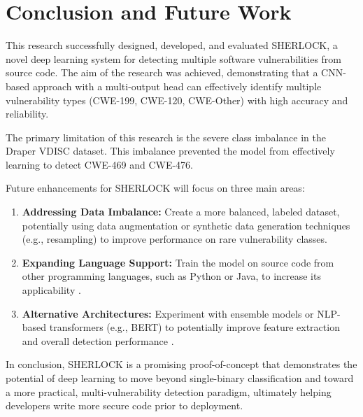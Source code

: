 \documentclass[conference]{IEEEtran}
\newcommand{\MYhyperreffix}{}
\let\MYhyperreffix\cite
\renewcommand{\cite}[1]{\MYhyperreffix{#1}}
\begin{document}
\section{Conclusion and Future Work}
This research successfully designed, developed, and evaluated SHERLOCK, a novel deep learning system for detecting multiple software vulnerabilities from source code. The aim of the research was achieved, demonstrating that a CNN-based approach with a multi-output head can effectively identify multiple vulnerability types (CWE-199, CWE-120, CWE-Other) with high accuracy and reliability.

The primary limitation of this research is the severe class imbalance in the Draper VDISC dataset. This imbalance prevented the model from effectively learning to detect CWE-469 and CWE-476.

Future enhancements for SHERLOCK will focus on three main areas:
\begin{enumerate}
    \item \textbf{Addressing Data Imbalance:} Create a more balanced, labeled dataset, potentially using data augmentation or synthetic data generation techniques (e.g., resampling) to improve performance on rare vulnerability classes.
    \item \textbf{Expanding Language Support:} Train the model on source code from other programming languages, such as Python or Java, to increase its applicability \cite{zhou_large_2024}.
    \item \textbf{Alternative Architectures:} Experiment with ensemble models or NLP-based transformers (e.g., BERT) to potentially improve feature extraction and overall detection performance \cite{salem_advancing_2024}.
\end{enumerate}

In conclusion, SHERLOCK is a promising proof-of-concept that demonstrates the potential of deep learning to move beyond single-binary classification and toward a more practical, multi-vulnerability detection paradigm, ultimately helping developers write more secure code prior to deployment.




\end{document}
